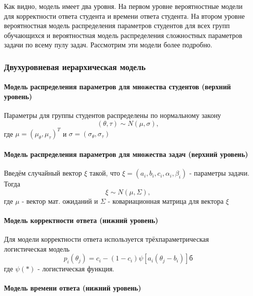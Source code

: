 Как видно, модель имеет два уровня. На первом уровне вероятностные модели для корректности ответа студента и времени ответа студента. На втором уровне вероятностная модель распределения параметров студентов для всех групп обучающихся и вероятностная модель распределения слож\-ностных параметров задачи по всему пулу задач. Рассмотрим эти модели более подробно.

\subsubsection{Двухуровневая иерархическая модель}

\paragraph {Модель распределения параметров для множества студентов (верхний уровень)}

Параметры для группы студентов распределены по нормальному закону
\begin{equation}
(\theta,\tau) \sim N(\mu,\sigma),
\end{equation}
где $\mu = (\mu_\theta, \mu_\tau)^T$ и $\sigma=(\sigma_\theta,\sigma_\tau)$

\paragraph {Модель распределения параметров для множества задач (верхний уровень)}

Введём случайный вектор $\xi$ такой, что $\xi = (a_i,b_i,c_i,\alpha_i, \beta_i)$ - параметры задачи. Тогда
\begin{equation}
\xi \sim N(\mu,\Sigma),
\end{equation}
где $\mu$ - вектор мат. ожиданий и $\Sigma$ - ковариационная матрица для вектора  $\xi$

\paragraph {Модель корректности ответа (нижний уровень)}

Для модели кор\-ректности ответа используется трёхпараметрическая логистическая модель
\begin{equation}
p_i(\theta_j) = c_i - (1-c_i)\psi[a_i(\theta_j - b_i)]б
\end{equation}
где $\psi( * )$ - логистическая функция.

\paragraph {Модель времени ответа (нижний уровень)}
\label{mvonu}

